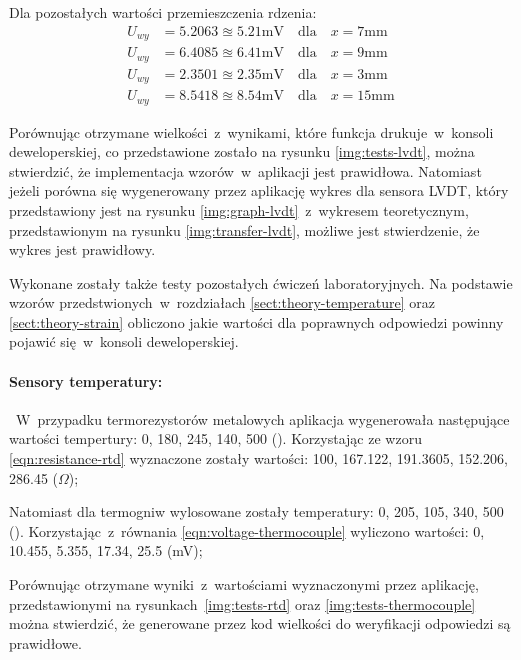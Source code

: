 Dla pozostałych wartości przemieszczenia rdzenia:
\begin{align*}
  U_{wy} & =5.2063\approxeq 5.21\text{mV}\quad\text{dla}\quad x=7\text{mm}  \\
  U_{wy} & =6.4085\approxeq 6.41\text{mV}\quad\text{dla}\quad x=9\text{mm}  \\
  U_{wy} & =2.3501\approxeq 2.35\text{mV}\quad\text{dla}\quad x=3\text{mm}  \\
  U_{wy} & =8.5418\approxeq 8.54\text{mV}\quad\text{dla}\quad x=15\text{mm}
\end{align*}

Porównując otrzymane wielkości~z~wynikami, które funkcja drukuje~w~konsoli deweloperskiej, co
przedstawione zostało na rysunku \ref{img:tests-lvdt}, można stwierdzić, że implementacja
wzorów~w~aplikacji jest prawidłowa. Natomiast jeżeli porówna się wygenerowany przez aplikację wykres
dla sensora LVDT, który przedstawiony jest na rysunku \ref{img:graph-lvdt}~z~wykresem teoretycznym,
przedstawionym na rysunku \ref{img:transfer-lvdt}, możliwe jest stwierdzenie, że wykres jest
prawidłowy.



Wykonane zostały także testy pozostałych ćwiczeń laboratoryjnych. Na podstawie wzorów
przedstwionych~w~rozdziałach \ref{sect:theory-temperature} oraz \ref{sect:theory-strain} obliczono
jakie wartości dla poprawnych odpowiedzi powinny pojawić się~w~konsoli deweloperskiej.

\paragraph{Sensory temperatury:}~W~przypadku termorezystorów metalowych aplikacja wygenerowała
następujące wartości tempertury: 0, 180, 245, 140, 500 (\degC). Korzystając ze wzoru
\ref{eqn:resistance-rtd} wyznaczone zostały wartości: 100, 167.122, 191.3605, 152.206, 286.45
($\Omega$);

Natomiast dla termogniw wylosowane zostały temperatury: 0, 205, 105, 340, 500 (\degC).
Korzystając~z~równania \ref{eqn:voltage-thermocouple} wyliczono wartości: 0, 10.455, 5.355, 17.34,
25.5 (mV);

Porównując otrzymane wyniki~z~wartościami wyznaczonymi przez aplikację, przedstawionymi na
rysunkach~\ref{img:tests-rtd} oraz \ref{img:tests-thermocouple} można stwierdzić, że
generowane przez kod wielkości do weryfikacji odpowiedzi są prawidłowe.

